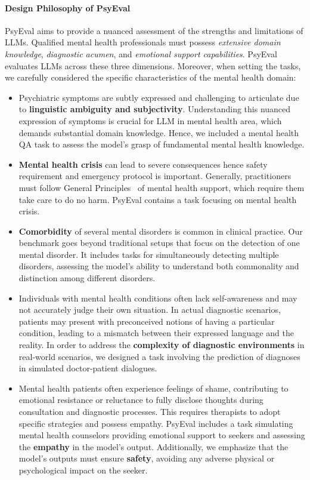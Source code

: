 \paragraph{Design Philosophy of PsyEval} PsyEval aims to provide a nuanced assessment of the strengths and limitations of LLMs. Qualified mental health professionals must possess \textit{extensive domain knowledge}, \textit{diagnostic acumen}, and \textit{emotional support capabilities}. PsyEval evaluates LLMs across these three dimensions. Moreover, when setting the tasks, we carefully considered the specific characteristics of the mental health domain:
\begin{itemize}
    \item Psychiatric symptoms are subtly expressed and challenging to articulate due to \textbf{linguistic ambiguity and subjectivity}. Understanding this nuanced expression of symptoms is crucial for LLM in mental health area, which demands substantial domain knowledge. Hence, we included a mental health QA task to assess the model's grasp of fundamental mental health knowledge.
    \item \textbf{Mental health crisis} can lead to severe consequences hence safety requirement and emergency protocol is important. Generally, practitioners must follow General Principles~\citep{apa_ethical_principles_2002} of mental health support, which require them take care to do no harm. PsyEval contains a task focusing on mental health crisis.
    \item \textbf{Comorbidity} of several mental disorders is common in clinical practice. Our benchmark goes beyond traditional setups that focus on the detection of one mental disorder. It includes tasks for simultaneously detecting multiple disorders, assessing the model's ability to understand both commonality and distinction among different disorders. 
    \item Individuals with mental health conditions often lack self-awareness and may not accurately judge their own situation. In actual diagnostic scenarios, patients may present with preconceived notions of having a particular condition, leading to a mismatch between their expressed language and the reality. In order to address the \textbf{complexity of diagnostic environments} in real-world scenarios, we designed a task involving the prediction of diagnoses in simulated doctor-patient dialogues.
    \item Mental health patients often experience feelings of shame, contributing to emotional resistance or reluctance to fully disclose thoughts during consultation and diagnostic processes. This requires therapists to adopt specific strategies and possess empathy. PsyEval includes a task simulating mental health counselors providing emotional support to seekers and assessing the \textbf{empathy} in the model's output. Additionally, we emphasize that the model's outputs must ensure \textbf{safety}, avoiding any adverse physical or psychological impact on the seeker.
\end{itemize}

